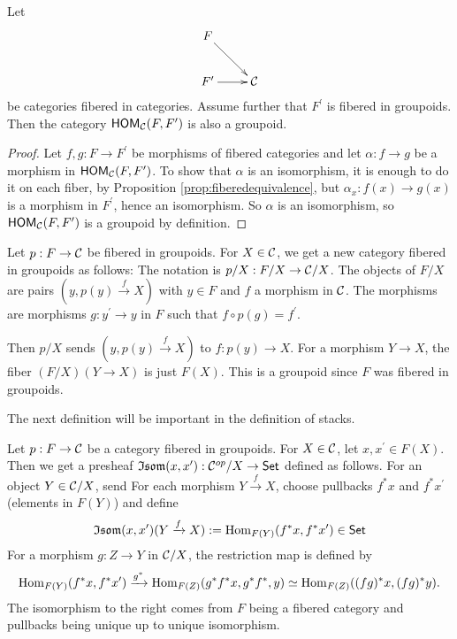 \documentclass[11pt, english]{article}
\begin{document}
\begin{lemma}
Let
\[
\xymatrix{
F \ar[dr] \\
F^\prime \ar[r] & \CC
}
\]
be categories fibered in categories. Assume further that $F^\prime$ is fibered in groupoids. Then the category $\operatorname{\mathsf{HOM}}_{\mathcal{C}}(F,F^\prime)$ is also a groupoid.
\end{lemma}
\begin{proof}
Let $f,g:F \to F^\prime$ be morphisms of fibered categories and let $\alpha:f \to g$ be a morphism in $\operatorname{\mathsf{HOM}}_{\mathcal{C}}(F,F^\prime)$. To show that $\alpha$ is an isomorphism, it is enough to do it on each fiber, by Proposition \ref{prop:fiberedequivalence}, but $\alpha_x:f(x) \to g(x)$ is a morphism in $F^\prime$, hence an isomorphism. So $\alpha$ is an isomorphism, so $\operatorname{\mathsf{HOM}}_{\mathcal{C}}(F,F^\prime)$ is a groupoid by definition.
\end{proof}

\begin{defi}
Let $p:F \to \mathcal{C}$ be fibered in groupoids. For $X \in \mathcal{C}$, we get a new category fibered in groupoids as follows: The notation is $p/X:F/X \to \mathcal{C}/X$. The objects of $F/X$ are pairs $(y,p(y) \xrightarrow{f} X)$  with $y \in F$ and $f$ a morphism in $\mathcal{C}$. The morphisms are morphisms $g:y^\prime \to y$ in $F$ such that $f \circ p(g) = f^\prime$.

Then $p/X$ sends $(y, p(y) \xrightarrow{f} X)$ to $f:p(y) \to X$. For a morphism $Y \to X$, the fiber $(F/X)(Y \to X)$ is just $F(X)$. This is a groupoid since $F$ was fibered in groupoids.
\end{defi}

The next definition will be important in the definition of stacks. 

\begin{defi} Let $p:F \to \mathcal{C}$ be a category fibered in groupoids. For $X \in \mathcal{C}$, let $x, x^\prime \in F(X)$. Then we  get a presheaf $\mathfrak{Isom}(x,x^\prime):\mathcal{C}^{op}/X \to \mathsf{Set}$ defined as follows. For an object $Y \in \mathcal{C}/X$, send  For each morphism $Y \xrightarrow{f} X$, choose pullbacks $f^\ast x$ and $f^\ast x^\prime$ (elements in $F(Y)$) and define
\[
\mathfrak{Isom}(x,x^\prime)(Y \xrightarrow{f} X) := \operatorname{Hom}_{F(Y)}(f^\ast x, f^\ast x^\prime) \in \mathsf{Set}
\]
For a morphism $g:Z \to Y$ in $\mathcal{C}/X$, the restriction map is defined by
\[
\operatorname{Hom}_{F(Y)}(f^\ast x, f^\ast x^\prime) \xrightarrow{g^\ast} \operatorname{Hom}_{F(Z)}(g^\ast f^\ast x, g^\ast f^\ast, y) \simeq \operatorname{Hom}_{F(Z)}((fg)^\ast x, (fg)^\ast y).
\]
The isomorphism to the right comes from $F$ being a fibered category and pullbacks being unique up to unique isomorphism.
\end{defi}
\end{document}
